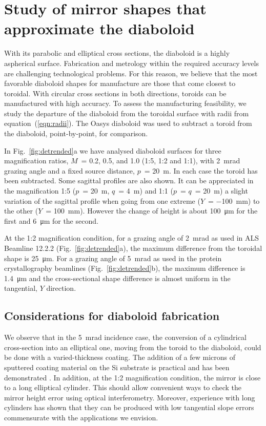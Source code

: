 \documentclass{iucr}       %
\newcommand{\inred}[1]{{\color{red}#1}}
\begin{document}
\section{Study of mirror shapes that approximate the diaboloid}
\label{sec:approximatedShapes}

With its parabolic and elliptical cross sections, the diaboloid is a highly aspherical surface. Fabrication and metrology within the required accuracy levels are challenging technological problems. For this reason, we believe that the most favorable diaboloid shapes for manufacture are those that come closest to toroidal. With circular cross sections in both directions, toroids can be manufactured with high accuracy. To assess the manufacturing feasibility, we study the departure of the diaboloid from the toroidal surface with radii from equation~(\ref{eqn:radii}). The Oasys diaboloid was used to subtract a toroid from the diaboloid, point-by-point, for comparison.

In Fig.~\ref{fig:detrended}a we have analysed diaboloid surfaces for three magnification ratios, $M$~= 0.2, 0.5, and 1.0 (1:5, 1:2 and 1:1), with \SI{2}{\milli\radian} grazing angle and a fixed source distance, $p$~= \SI{20}{\meter}. In each case the toroid has been subtracted. Some sagittal profiles are also shown. It can be appreciated in the magnification 1:5 ($p$~= \SI{20}{\meter}, $q$~= \SI{4}{\meter}) and 1:1 ($p$~= $q$~= \SI{20}{\meter}) a slight variation of the sagittal profile when going from one extreme ($Y$~= \SI{-100}{\milli\meter}) to the other ($Y$~= \SI{100}{\milli\meter}). However the change of height is about \SI{100}{\micro\meter} for the first and \SI{6}{\micro\meter} for the second. 

At the 1:2 magnification condition, for a grazing angle of \SI{2}{\milli\radian} as used in ALS Beamline 12.2.2 (Fig.~\ref{fig:detrended}a), the maximum difference from the toroidal shape is \SI{25}{\micro\meter}. For a grazing angle of \SI{5}{\milli\radian} as used in the protein crystallography beamlines (Fig.~\ref{fig:detrended}b), the maximum difference is \SI{1.4}{\micro\meter} and the cross-sectional shape difference is almost uniform in the tangential, $Y$ direction.

\subsection{Considerations for diaboloid fabrication}
We observe that in the \SI{5}{\milli\radian} incidence case, the conversion of a cylindrical cross-section into an elliptical one, moving from the toroid to the diaboloid, could be done with a varied-thickness coating. The addition of a few microns of sputtered coating material
on the Si substrate is practical and has been demonstrated \cite{Morawe}. In addition, at the 1:2 magnification condition, the mirror is close to a long elliptical cylinder. This should allow convenient ways to check the mirror height error using optical interferometry. Moreover, experience with long cylinders has shown that they can be produced with low tangential slope errors commensurate with the applications we envision. 
\end{document}
